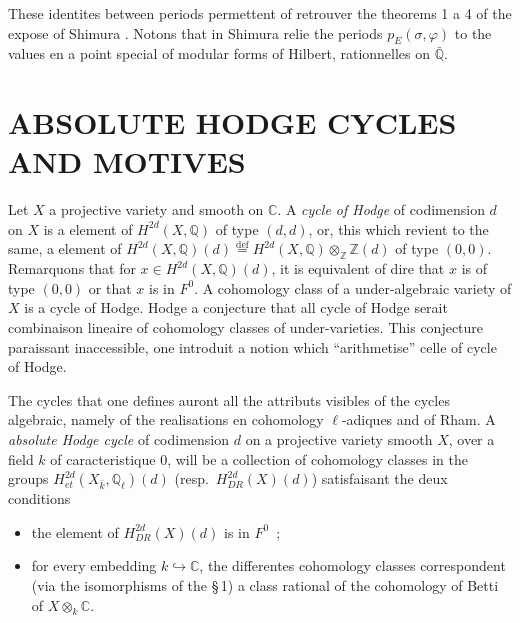 \documentclass[12pt,a4paper]{article}
\theoremstyle{plain}
\theoremstyle{definition}
\theoremstyle{remark}
\newcommand{\ZZ}{\mathbb{Z}}
\newcommand{\QQ}{\mathbb{Q}}
\newcommand{\CC}{\mathbb{C}}
\providecommand{\CC}{\mathbb{C}}
\providecommand{\QQ}{\mathbb{Q}}
\providecommand{\ZZ}{\mathbb{Z}}
\begin{document}
These identites between periods permettent of retrouver the theorems 1 a 4 of the expose of Shimura \cite{Shimura2}. Notons that in \cite{Shimura2} Shimura relie the periods $p_E(\sigma, \varphi)$ to the values en a point special of modular forms of Hilbert, rationnelles on $\bar{\QQ}$.

\section{ABSOLUTE HODGE CYCLES AND MOTIVES}

Let $X$ a projective variety and smooth on $\CC$. A \emph{cycle of Hodge} of codimension $d$ on $X$ is a element of $H^{2d}(X, \QQ)$ of type $(d,d)$, or, this which revient to the same, a element of $H^{2d}(X, \QQ)(d) \overset{\text{def}}{=} H^{2d}(X, \QQ) \otimes_\ZZ \ZZ(d)$ of type $(0,0)$. Remarquons that for $x \in H^{2d}(X, \QQ)(d)$, it is equivalent of dire that $x$ is of type $(0,0)$ or that $x$ is in $F^0$. A cohomology class of a under-algebraic variety of $X$ is a cycle of Hodge. Hodge a conjecture that all cycle of Hodge serait combinaison lineaire of cohomology classes of under-varieties. This conjecture paraissant inaccessible, one introduit a notion which ``arithmetise'' celle of cycle of Hodge.

The cycles that one defines auront all the attributs visibles of the cycles algebraic, namely of the realisations en cohomology $\ell$-adiques and of Rham. A \emph{absolute Hodge cycle} of codimension $d$ on a projective variety smooth $X$, over a field $k$ of caracteristique $0$, will be a collection of cohomology classes in the groups $H^{2d}_{et}(X_{\bar{k}}, \QQ_\ell)(d)$ (resp.~$H^{2d}_{DR}(X)(d)$) satisfaisant the deux conditions
\begin{itemize}
\item the element of $H^{2d}_{DR}(X)(d)$ is in $F^0$~;
\item for every embedding $k \hookrightarrow \CC$, the differentes cohomology classes correspondent (via the isomorphisms of the \S\,1) a class rational of the cohomology of Betti of $X \otimes_k \CC$.
\end{itemize}
\end{document}
